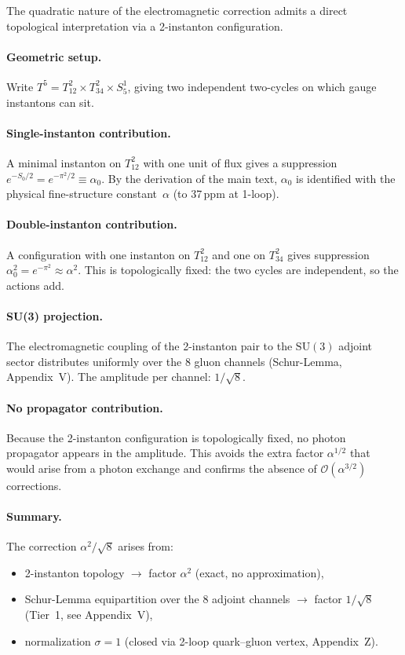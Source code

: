 \documentclass[11pt,a4paper]{article}
\begin{document}
The quadratic nature of the electromagnetic correction admits a direct
topological interpretation via a 2-instanton configuration.

\paragraph{Geometric setup.}
Write $T^5=T^2_{12}\times T^2_{34}\times S^1_5$, giving two independent
two-cycles on which gauge instantons can sit.

\paragraph{Single-instanton contribution.}
A minimal instanton on $T^2_{12}$ with one unit of flux gives a suppression
$e^{-S_0/2}=e^{-\pi^2/2}\equiv\alpha_0$.  By the derivation of the main text,
$\alpha_0$ is identified with the physical fine-structure constant~$\alpha$
(to 37\,ppm at 1-loop).

\paragraph{Double-instanton contribution.}
A configuration with one instanton on $T^2_{12}$ and one on $T^2_{34}$
gives suppression $\alpha_0^2=e^{-\pi^2}\approx\alpha^2$.  This is
topologically fixed: the two cycles are independent, so the actions add.

\paragraph{SU(3) projection.}
The electromagnetic coupling of the 2-instanton pair to the $\mathrm{SU}(3)$
adjoint sector distributes uniformly over the 8 gluon channels (Schur-Lemma,
Appendix~V).  The amplitude per channel: $1/\sqrt{8}$.

\paragraph{No propagator contribution.}
Because the 2-instanton configuration is topologically fixed, no photon
propagator appears in the amplitude.  This avoids the extra factor
$\alpha^{1/2}$ that would arise from a photon exchange and confirms the
absence of $\mathcal{O}(\alpha^{3/2})$ corrections.

\paragraph{Summary.}  The correction $\alpha^2/\sqrt{8}$ arises from:
\begin{itemize}[leftmargin=1.5em]
  \item 2-instanton topology $\to$ factor $\alpha^2$ (exact, no approximation),
  \item Schur-Lemma equipartition over the 8 adjoint channels $\to$ factor
    $1/\sqrt{8}$ (Tier~1, see Appendix~V),
  \item normalization $\sigma=1$ (closed via 2-loop quark--gluon vertex, Appendix~Z).
\end{itemize}
\end{document}
